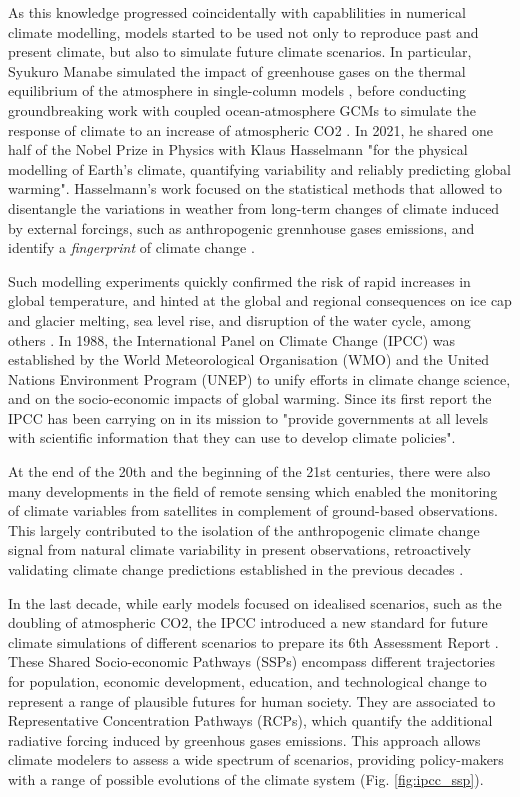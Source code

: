 As this knowledge progressed coincidentally with capablilities in numerical climate modelling, models started to be used not only to reproduce past and present climate, but also to simulate future climate scenarios. 
In particular, Syukuro Manabe simulated the impact of greenhouse gases on the thermal equilibrium of the atmosphere in single-column models \citep{manabe_thermal_1964}
, before conducting groundbreaking work with coupled ocean-atmosphere GCMs to simulate the response of climate to an increase of atmospheric CO2 \citep{manabe_sensitivity_1980}. 
In 2021, he shared one half of the Nobel Prize in Physics with Klaus Hasselmann "for the physical modelling of Earth's climate, quantifying variability and reliably predicting global warming". 
Hasselmann's work focused on the statistical methods that allowed to disentangle the variations in weather from long-term changes of climate induced by external forcings, such as anthropogenic grennhouse gases emissions, and identify a \textit{fingerprint} of climate change \citep{hasselmann_optimal_1993,hasselmann_stochastic_2022}.

Such modelling experiments quickly confirmed the risk of rapid increases in global temperature, and hinted at the global and regional consequences on ice cap and glacier melting, sea level rise, and disruption of the water cycle, among others \citep{hansen_global_1988}. 
In 1988, the International Panel on Climate Change (IPCC) was established by the World Meteorological Organisation (WMO) and the United Nations Environment Program (UNEP) to unify efforts in climate change science, and on the socio-economic impacts of global warming. Since its first report \citep{IPCC_1990_AR1_WG1} the IPCC has been carrying on in its mission to "provide governments at all levels with scientific information that they can use to develop climate policies".

At the end of the 20th and the beginning of the 21st centuries, there were also many developments in the field of remote sensing which enabled the monitoring of climate variables from satellites in complement of ground-based observations. This largely contributed to the isolation of the anthropogenic climate change signal from natural climate variability in present observations, retroactively validating climate change predictions established in the previous decades \citep{hansen_earths_2005,yang_role_2013}.

In the last decade, while early models focused on idealised scenarios, such as the doubling of atmospheric CO2, the IPCC introduced a new standard for future climate simulations of different scenarios to prepare its 6th Assessment Report \citep{RN1}. These Shared Socio-economic Pathways (SSPs) encompass different trajectories for population, economic development, education, and technological change to represent a range of plausible futures for human society. They are associated to Representative Concentration Pathways (RCPs), which quantify the additional radiative forcing induced by greenhous gases emissions.
This approach allows climate modelers to assess a wide spectrum of scenarios, providing policy-makers with a range of possible evolutions of the climate system (Fig. \ref{fig:ipcc_ssp}).

